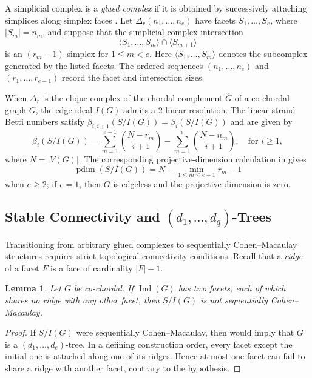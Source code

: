 \documentclass[12pt, reqno]{amsart}
\newtheorem{lemma}[theorem]{Lemma}
\theoremstyle{definition}
\numberwithin{equation}{section}
\begin{document}
A simplicial complex is a \emph{glued complex} if it is obtained by successively attaching simplices along simplex faces \cite{namiq2026_explicit}.  Let $\Delta_r(n_1,\ldots,n_e)$ have facets $S_1,\ldots,S_e$, where $|S_m|=n_m$, and suppose that the simplicial-complex intersection
\[
\langle S_1,\ldots,S_m\rangle\cap\langle S_{m+1}\rangle
\]
is an $(r_m-1)$-simplex for $1\le m<e$.  Here $\langle S_1,\ldots,S_m\rangle$ denotes the subcomplex generated by the listed facets.  The ordered sequences $(n_1,\ldots,n_e)$ and $(r_1,\ldots,r_{e-1})$ record the facet and intersection sizes.
	
	When $\Delta_r$ is the clique complex of the chordal complement $\overline{G}$ of a co-chordal graph $G$, the edge ideal $I(G)$ admits a $2$-linear resolution. The linear-strand Betti numbers satisfy $\beta_{i,i+1}(S/I(G))=\beta_i(S/I(G))$ and are given by \cite{namiq2026_explicit}
	\begin{equation}\label{eq:general_betti}
		\beta_i(S/I(G)) = \sum_{m=1}^{e-1}\binom{N-r_m}{i+1} - \sum_{m=1}^{e}\binom{N-n_m}{i+1}, \quad \text{for } i \ge1,
	\end{equation}
	where $N=|V(G)|$. The corresponding projective-dimension calculation in \cite{namiq2026_explicit} gives
	\[
\operatorname{pdim}(S/I(G))=N-\min_{1\le m\le e-1}r_m-1
\]
when $e\ge2$; if $e=1$, then $G$ is edgeless and the projective dimension is zero.
	
	\subsection{Stable Connectivity and \texorpdfstring{$(d_1,\ldots,d_q)$}{(d1,...,dq)}-Trees}
	
	Transitioning from arbitrary glued complexes to sequentially Cohen--Macaulay structures requires strict topological connectivity conditions. Recall that a \emph{ridge} of a facet $F$ is a face of cardinality $|F|-1$.
	
	\begin{lemma}\label{lem:ridge-obstruction}
Let $G$ be co-chordal.  If $\operatorname{Ind}(G)$ has two facets, each of which shares no ridge with any other facet, then $S/I(G)$ is not sequentially Cohen--Macaulay.
\end{lemma}
\begin{proof}
If $S/I(G)$ were sequentially Cohen--Macaulay, then \cite[Theorem~3.2]{ahmed2025} would imply that $\overline G$ is a $(d_1,\ldots,d_e)$-tree.  In a defining construction order, every facet except the initial one is attached along one of its ridges.  Hence at most one facet can fail to share a ridge with another facet, contrary to the hypothesis.
\end{proof}
	
\end{document}
